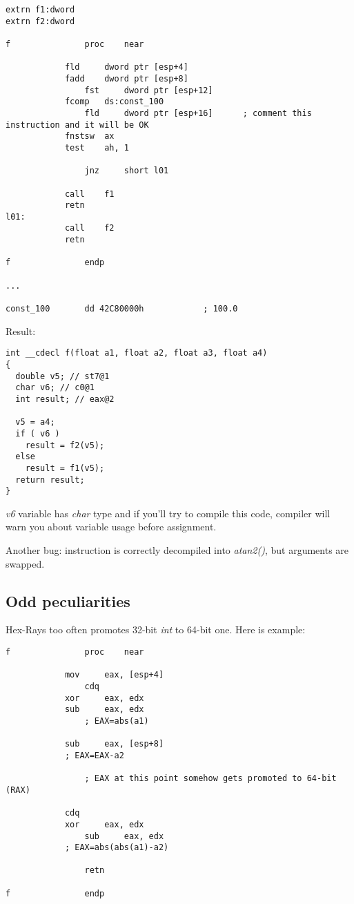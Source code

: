 \begin{lstlisting}[style=customasmx86]
extrn f1:dword
extrn f2:dword

f               proc    near

	        fld     dword ptr [esp+4]
        	fadd    dword ptr [esp+8]
                fst     dword ptr [esp+12]
	        fcomp   ds:const_100
                fld     dword ptr [esp+16]      ; comment this instruction and it will be OK
	        fnstsw  ax
        	test    ah, 1

                jnz     short l01

	        call    f1
        	retn
l01:
	        call    f2
        	retn

f               endp

...

const_100       dd 42C80000h            ; 100.0
\end{lstlisting}

Result:

\begin{lstlisting}[style=customc]
int __cdecl f(float a1, float a2, float a3, float a4)
{
  double v5; // st7@1
  char v6; // c0@1
  int result; // eax@2

  v5 = a4;
  if ( v6 )
    result = f2(v5);
  else
    result = f1(v5);
  return result;
}
\end{lstlisting}

\emph{v6} variable has \emph{char} type and if you'll try to compile this code, compiler will warn you about variable
usage before assignment.

Another bug:  instruction is correctly decompiled into \emph{atan2()}, but arguments are swapped.

\subsection{Odd peculiarities}

Hex-Rays too often promotes 32-bit \emph{int} to 64-bit one.
Here is example:

\begin{lstlisting}[style=customasmx86]
f               proc    near

	        mov     eax, [esp+4]
                cdq
	        xor     eax, edx
        	sub     eax, edx
                ; EAX=abs(a1)

	        sub     eax, [esp+8]
        	; EAX=EAX-a2

                ; EAX at this point somehow gets promoted to 64-bit (RAX)

	        cdq
        	xor     eax, edx
                sub     eax, edx
	        ; EAX=abs(abs(a1)-a2)

                retn

f               endp
\end{lstlisting}

